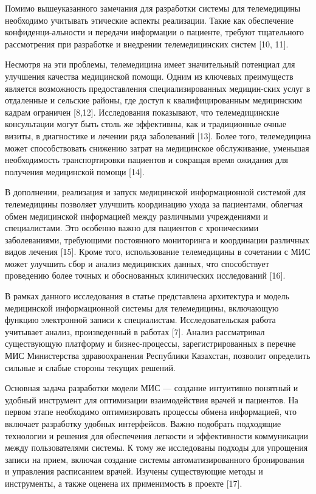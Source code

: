 \begin{multicols}{2}
Помимо вышеуказанного замечания для разработки системы для телемедицины
необходимо учитывать этические аспекты реализации. Такие как обеспечение
конфиденци-альности и передачи информации о пациенте, требуют тщательного
рассмотрения при разработке и внедрении телемедицинских систем {[}10,
11{]}.

Несмотря на эти проблемы, телемедицина имеет значительный потенциал для
улучшения качества медицинской помощи. Одним из ключевых преимуществ
является возможность предоставления специализированных медицин-ских услуг
в отдаленные и сельские районы, где доступ к квалифицированным
медицинским кадрам ограничен {[}8,12{]}. Исследования показывают, что
телемедицинские консультации могут быть столь же эффективны, как и
традиционные очные визиты, в диагностике и лечении ряда заболеваний
{[}13{]}. Более того, телемедицина может способствовать снижению затрат
на медицинское обслуживание, уменьшая необходимость транспортировки
пациентов и сокращая время ожидания для получения медицинской помощи
{[}14{]}.

В дополнении, реализация и запуск медицинской информационной системой
для телемедицины позволяет улучшить координацию ухода за пациентами,
облегчая обмен медицинской информацией между различными учреждениями и
специалистами. Это особенно важно для пациентов с хроническими
заболеваниями, требующими постоянного мониторинга и координации
различных видов лечения {[}15{]}. Кроме того, использование телемедицины
в сочетании с МИС может улучшить сбор и анализ медицинских данных, что
способствует проведению более точных и обоснованных клинических
исследований {[}16{]}.

В рамках данного исследования в статье представлена архитектура и модель
медицинской информационной системы для телемедицины, включающую функцию
электронной записи к специалистам. Исследовательская работа учитывает
анализ, произведенный в работах {[}7{]}. Анализ рассматривал
существующую платформу и бизнес-процессы, зарегистрированных в перечне
МИС Министерства здравоохранения Республики Казахстан, позволит
определить сильные и слабые стороны текущих решений.

Основная задача разработки модели МИС --- создание интуитивно понятный и
удобный инструмент для оптимизации взаимодействия врачей и пациентов. На
первом этапе необходимо оптимизировать процессы обмена информацией, что
включает разработку удобных интерфейсов. Важно подобрать подходящие
технологии и решения для обеспечения легкости и эффективности
коммуникации между пользователями системы. К тому же исследованы подходы
для упрощения записи на прием, включая создание системы
автоматизированного бронирования и управления расписанием врачей.
Изучены существующие методы и инструменты, а также оценена их
применимость в проекте {[}17{]}.


\end{multicols}
